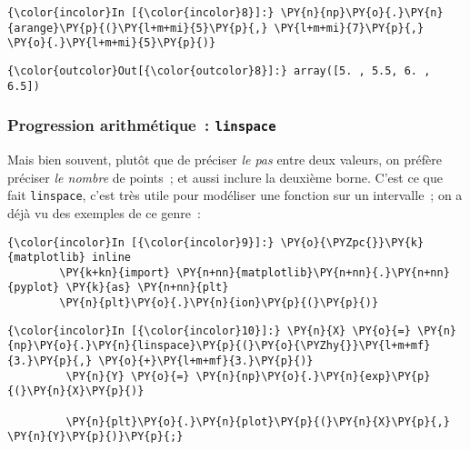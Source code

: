     \begin{Verbatim}[commandchars=\\\{\}]
{\color{incolor}In [{\color{incolor}8}]:} \PY{n}{np}\PY{o}{.}\PY{n}{arange}\PY{p}{(}\PY{l+m+mi}{5}\PY{p}{,} \PY{l+m+mi}{7}\PY{p}{,} \PY{o}{.}\PY{l+m+mi}{5}\PY{p}{)}
\end{Verbatim}


\begin{Verbatim}[commandchars=\\\{\}]
{\color{outcolor}Out[{\color{outcolor}8}]:} array([5. , 5.5, 6. , 6.5])
\end{Verbatim}
            
    \hypertarget{progression-arithmuxe9tique-linspace}{%
\subsubsection{\texorpdfstring{Progression arithmétique~:
\texttt{linspace}}{Progression arithmétique~: linspace}}\label{progression-arithmuxe9tique-linspace}}

    Mais bien souvent, plutôt que de préciser \emph{le pas} entre deux
valeurs, on préfère préciser \emph{le nombre} de points~; et aussi
inclure la deuxième borne. C'est ce que fait \texttt{linspace}, c'est
très utile pour modéliser une fonction sur un intervalle~; on a déjà vu
des exemples de ce genre~:

    \begin{Verbatim}[commandchars=\\\{\}]
{\color{incolor}In [{\color{incolor}9}]:} \PY{o}{\PYZpc{}}\PY{k}{matplotlib} inline
        \PY{k+kn}{import} \PY{n+nn}{matplotlib}\PY{n+nn}{.}\PY{n+nn}{pyplot} \PY{k}{as} \PY{n+nn}{plt}
        \PY{n}{plt}\PY{o}{.}\PY{n}{ion}\PY{p}{(}\PY{p}{)}
\end{Verbatim}


    \begin{Verbatim}[commandchars=\\\{\}]
{\color{incolor}In [{\color{incolor}10}]:} \PY{n}{X} \PY{o}{=} \PY{n}{np}\PY{o}{.}\PY{n}{linspace}\PY{p}{(}\PY{o}{\PYZhy{}}\PY{l+m+mf}{3.}\PY{p}{,} \PY{o}{+}\PY{l+m+mf}{3.}\PY{p}{)}
         \PY{n}{Y} \PY{o}{=} \PY{n}{np}\PY{o}{.}\PY{n}{exp}\PY{p}{(}\PY{n}{X}\PY{p}{)}
         
         \PY{n}{plt}\PY{o}{.}\PY{n}{plot}\PY{p}{(}\PY{n}{X}\PY{p}{,} \PY{n}{Y}\PY{p}{)}\PY{p}{;}
\end{Verbatim}


    \begin{center}
    \end{center}
    { \hspace*{\fill} \\}
    
